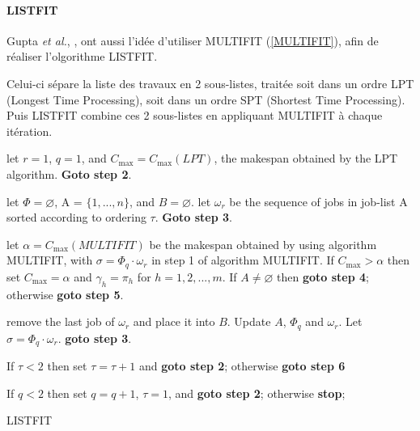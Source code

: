 \documentclass[a4paper,12pt]{report}
\theoremstyle{plain}				%
\theoremstyle{definition}				%
\begin{document}
\paragraph{LISTFIT}

Gupta \textit{et al.}, \cite{gupta2001listfit}, ont aussi l'idée
d'utiliser MULTIFIT (\ref{MULTIFIT}), afin de réaliser l'olgorithme
LISTFIT.

Celui-ci sépare la liste des travaux en 2 sous-listes, traitée soit
dans un ordre LPT (Longest Time Processing), soit dans un ordre SPT
(Shortest Time Processing).
Puis LISTFIT combine ces 2 sous-listes en appliquant MULTIFIT à chaque
itération.

\bigskip
\begin{algorithm}[H]
\DontPrintSemicolon
{}

let $r=1$, $q=1$, and $C_{\max}=C_{\max}(LPT)$, the makespan obtained
by the LPT algorithm.
\textbf{Goto step 2}.

\BlankLine %
let $\Phi = \varnothing$, A = $\{1,...,n\}$, and $B = \varnothing$.
let $\omega_r$ be the sequence of jobs in job-list A sorted according
to ordering $\tau$.
\textbf{Goto step 3}.

\BlankLine %
let $\alpha=C_{\max}(MULTIFIT)$ be the makespan obtained by using
algorithm MULTIFIT, with $\sigma = \Phi_q \cdot \omega_r$ in step 1 of
algorithm MULTIFIT.
If $C_{\max}>\alpha$ then set $C_{\max} = \alpha$ and
$\gamma_h = \pi_h$ for $h=1,2,...,m$.
If $A \neq \varnothing$ then \textbf{goto step 4}; otherwise
\textbf{goto step 5}.

\BlankLine %
remove the last job of $\omega_r$ and place it into $B$.
Update $A$, $\Phi_q$ and $\omega_r$.
Let $\sigma = \Phi_q \cdot \omega_r$.
\textbf{goto step 3}.

\BlankLine %
If {$\tau < 2$} then set $\tau = \tau + 1$ and \textbf{goto step 2};
otherwise \textbf{goto step 6}

\BlankLine %
If $q<2$ then set $q=q+1$, $\tau = 1$, and \textbf{goto step 2};
otherwise \textbf{stop}; 

\caption{LISTFIT\label{LISTFIT}}
\end{algorithm}
\end{document}
